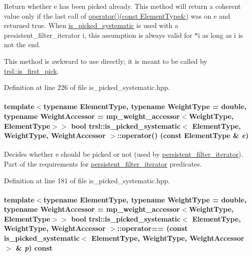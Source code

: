 Return whether {\ttfamily e} has been picked already. This method will return a coherent value only if the last call of \hyperlink{classtrsl_1_1is__picked__systematic_a95574c2aeff95ece7389efaa915e5d12}{operator()(const ElementType\&)} was on {\ttfamily e} and returned true. When \hyperlink{classtrsl_1_1is__picked__systematic}{is\_\-picked\_\-systematic} is used with a presistent\_\-filter\_\-iterator {\ttfamily i}, this assumption is always valid for {\ttfamily $\ast$i} as long as {\ttfamily i} is not the end.

This method is awkward to use directly; it is meant to be called by \hyperlink{namespacetrsl_a412db7961cfc65236d71610635038225}{trsl::is\_\-first\_\-pick}. 

Definition at line 226 of file is\_\-picked\_\-systematic.hpp.\hypertarget{classtrsl_1_1is__picked__systematic_a95574c2aeff95ece7389efaa915e5d12}{
\paragraph[{operator()}]{\setlength{\rightskip}{0pt plus 5cm}template$<$typename ElementType, typename WeightType = double, typename WeightAccessor = mp\_\-weight\_\-accessor$<$WeightType, ElementType$>$$>$ bool {\bf trsl::is\_\-picked\_\-systematic}$<$ ElementType, WeightType, WeightAccessor $>$::operator() (const ElementType \& {\em e})}\hfill}
\label{classtrsl_1_1is__picked__systematic_a95574c2aeff95ece7389efaa915e5d12}


Decides whether {\ttfamily e} should be picked or not (used by \hyperlink{classtrsl_1_1persistent__filter__iterator}{persistent\_\-filter\_\-iterator}). Part of the requirements for \hyperlink{classtrsl_1_1persistent__filter__iterator}{persistent\_\-filter\_\-iterator} predicates. 

Definition at line 181 of file is\_\-picked\_\-systematic.hpp.\hypertarget{classtrsl_1_1is__picked__systematic_aaa69edda00def493c8c50c2d0164f64c}{
\paragraph[{operator==}]{\setlength{\rightskip}{0pt plus 5cm}template$<$typename ElementType, typename WeightType = double, typename WeightAccessor = mp\_\-weight\_\-accessor$<$WeightType, ElementType$>$$>$ bool {\bf trsl::is\_\-picked\_\-systematic}$<$ ElementType, WeightType, WeightAccessor $>$::operator== (const {\bf is\_\-picked\_\-systematic}$<$ ElementType, WeightType, WeightAccessor $>$ \& {\em p}) const}\hfill}
\label{classtrsl_1_1is__picked__systematic_aaa69edda00def493c8c50c2d0164f64c}


